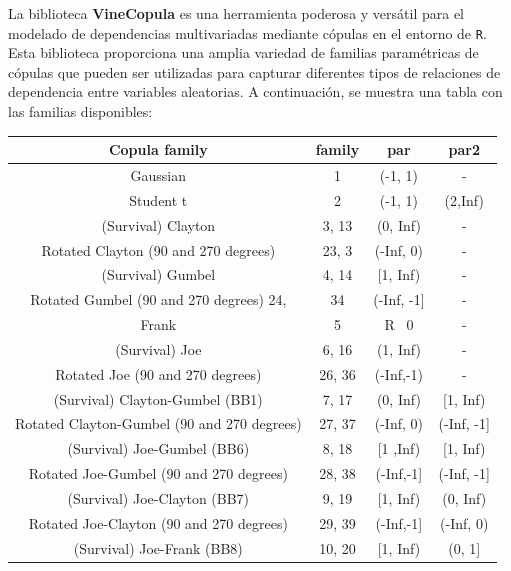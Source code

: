 La biblioteca \textbf{VineCopula} es una herramienta poderosa y versátil para el modelado de dependencias multivariadas mediante cópulas en el entorno de \texttt{R}. Esta biblioteca proporciona una amplia variedad de familias paramétricas de cópulas que pueden ser utilizadas para capturar diferentes tipos de relaciones de dependencia entre variables aleatorias. A continuación, se muestra una tabla con las familias disponibles:

\begin{table}[H]
    \centering
    \begin{tabular}{||c|c|c|c||}
    \hline\hline
\textbf{Copula family}	       & \textbf{family}    & \textbf{par}	    & \textbf{par2}      \\\hline
Gaussian	                                & 1	        & (-1, 1)	& -         \\
Student t	                                & 2	        & (-1, 1)	& (2,Inf)   \\
(Survival) Clayton	                        & 3, 13	    & (0, Inf)	& -         \\
Rotated Clayton (90 and 270 degrees)	    & 23, 3     & (-Inf, 0)	& -         \\
(Survival) Gumbel	                        & 4, 14	    & [1, Inf)	& -         \\
Rotated Gumbel (90 and 270 degrees)	24,     & 34	    & (-Inf, -1]& -         \\
Frank	                                    & 5	        & R \ {0}	& -         \\
(Survival) Joe	                            & 6, 16	    & (1, Inf)	& -         \\
Rotated Joe (90 and 270 degrees)	        & 26, 36    & (-Inf,-1)	& -         \\
(Survival) Clayton-Gumbel (BB1)	            & 7, 17	    & (0, Inf)	& [1, Inf)  \\
Rotated Clayton-Gumbel (90 and 270 degrees)	& 27, 37	& (-Inf, 0)	& (-Inf, -1]\\
(Survival) Joe-Gumbel (BB6)	                & 8, 18	    & [1 ,Inf)	& [1, Inf)  \\
Rotated Joe-Gumbel (90 and 270 degrees)	    & 28, 38	& (-Inf,-1]	& (-Inf, -1]\\
(Survival) Joe-Clayton (BB7)	            & 9, 19	    & [1, Inf)	& (0, Inf)  \\
Rotated Joe-Clayton (90 and 270 degrees)	& 29, 39	& (-Inf,-1]	& (-Inf, 0) \\
(Survival) Joe-Frank (BB8)	                & 10, 20	& [1, Inf)	& (0, 1]    \\

\end{tabular}
\end{table}
